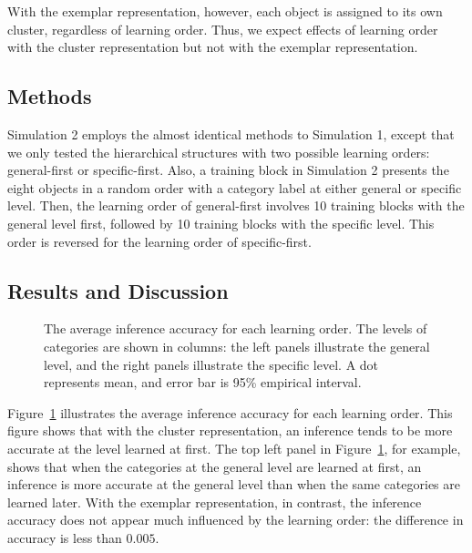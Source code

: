 \documentclass[doc]{apa6}
\begin{document}
With the exemplar representation, however, each object is assigned to its own cluster, regardless of
learning order. Thus, we expect effects of learning order with the cluster representation but not
with the exemplar representation.


\subsection*{Methods}

Simulation 2 employs the almost identical methods to Simulation 1, except that we only tested the
hierarchical structures with two possible learning orders: general-first or specific-first. Also, a
training block in Simulation 2 presents the eight objects in a random order with a category label at
either general or specific level. Then, the learning order of general-first involves 10 training
blocks with the general level first, followed by 10 training blocks with the specific level. This
order is reversed for the learning order of specific-first.

\subsection*{Results and Discussion}

\begin{figure}[t!]
    \centering



    \vspace{10pt}

    \caption{The average inference accuracy for each learning order.  The levels of categories are
    shown in columns: the left panels illustrate the general level, and the right panels illustrate
    the specific level.   A dot represents mean, and error bar is 95\% empirical interval.}

\label{fig:result2}
\end{figure}

Figure~\ref{fig:result2} illustrates the average inference accuracy for each learning order. This
figure shows that with the cluster representation, an inference tends to be more accurate at the
level learned at first.  The top left panel in Figure~\ref{fig:result2}, for example, shows that
when the categories at the general level are learned at first, an inference is more accurate at the
general level than when the same categories are learned later. With the exemplar representation, in
contrast, the inference accuracy does not appear much influenced by the learning order: the
difference in accuracy is less than $0.005$.
\end{document}
